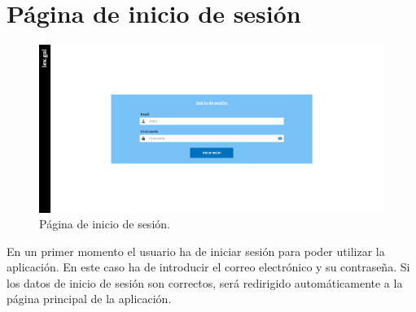 \section{Página de inicio de sesión}
\label{PInicioSesion}

\begin{figure}[H]
\centerline{\includegraphics[width=15cm]{figuras/manualUsuario/InicioSesion.PNG}}
\caption{Página de inicio de sesión.}
\label{enlacePInicioSesion}
\end{figure}

En un primer momento el usuario ha de iniciar sesión para poder utilizar la aplicación. En este caso ha de introducir el correo electrónico y su contraseña. Si los datos de inicio de sesión son correctos, será redirigido automáticamente a la página principal de la aplicación.